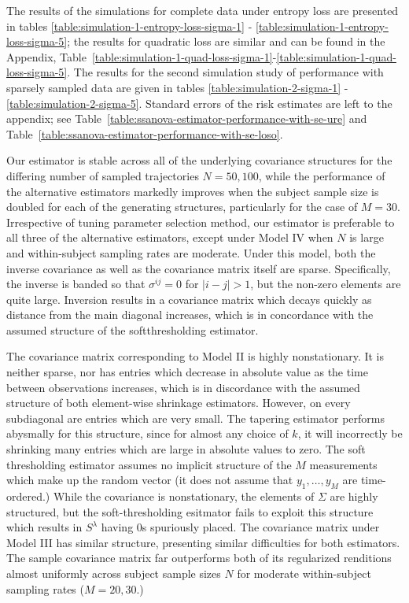\documentclass[12pt]{article}
\newcommand*\needsparaphrased{\color{red}}
\theoremstyle{definition}
\begin{document}
{\needsparaphrased{TODO: Include figures of the true Cholesky surfaces for models 2-5.}}

\bigskip

The results of the simulations for complete data under entropy loss are presented in tables \ref{table:simulation-1-entropy-loss-sigma-1} - \ref{table:simulation-1-entropy-loss-sigma-5}; the results for quadratic loss are similar and can be found in the Appendix, Table~\ref{table:simulation-1-quad-loss-sigma-1}-\ref{table:simulation-1-quad-loss-sigma-5}. The results for the second simulation study of performance with sparsely sampled data are given in tables \ref{table:simulation-2-sigma-1} - \ref{table:simulation-2-sigma-5}.  Standard errors of the risk estimates are left to the appendix; see Table~\ref{table:ssanova-estimator-performance-with-se-ure} and Table~\ref{table:ssanova-estimator-performance-with-se-loso}.

\bigskip


Our estimator is stable across all of the underlying covariance  structures for the differing number of sampled trajectories $N = 50, 100$, while the performance of the alternative estimators markedly improves when the subject sample size is doubled for each of the generating structures, particularly for the case of $M = 30$. Irrespective of tuning parameter selection method, our estimator is preferable to all three of the alternative estimators, except under Model IV when $N$ is large and within-subject sampling rates are moderate. Under this model, both the inverse covariance as well as the covariance matrix itself are sparse. Specifically, the inverse is banded so that $\sigma^{ij} = 0$ for $\vert i - j \vert > 1$, but the non-zero elements are quite large. Inversion results in a covariance matrix which decays quickly as distance from the main diagonal increases, which is in concordance with the assumed structure of the softthresholding estimator. 

\bigskip

The covariance matrix corresponding to Model II is highly nonstationary. It is neither sparse, nor has entries which decrease in absolute value as the time between observations increases, which is in discordance with the assumed structure of both element-wise shrinkage estimators. However, on every subdiagonal are entries which are very small. The tapering estimator performs abysmally for this structure, since for almost any choice of $k$, it will incorrectly be shrinking many entries which are large in absolute values to zero. The soft thresholding estimator assumes no implicit structure of the $M$ measurements which make up the random vector (it does not assume that $y_1,\dots, y_M$ are time-ordered.) While the covariance is nonstationary, the elements of $\Sigma$ are highly structured, but the soft-thresholding esitmator fails to exploit this structure which results in $S^\lambda$ having 0s spuriously placed. The covariance matrix under Model III has similar structure, presenting similar difficulties for both estimators. The sample covariance matrix far outperforms both of its regularized renditions almost uniformly across subject sample sizes $N$ for moderate within-subject sampling rates ($M = 20, 30$.)
 
\end{document}
